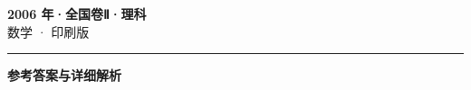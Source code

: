 \documentclass[zihao=5, a4paper]{ctexart}
\begin{document}
\begin{center}
  {\Large\bfseries 2006 年·全国卷Ⅱ·理科}\\[4pt]
  {\large 数学 · 印刷版}
\end{center}
\medskip
{}

\par\bigskip\hrule\bigskip
{}
\begin{center}{\large\bfseries 参考答案与详细解析}\end{center}
\smallskip

\end{document}
